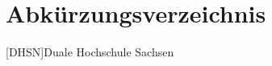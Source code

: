 \section*{Abkürzungsverzeichnis}

\begin{acronym}
    [DHSN]{Duale Hochschule Sachsen}
\end{acronym}
